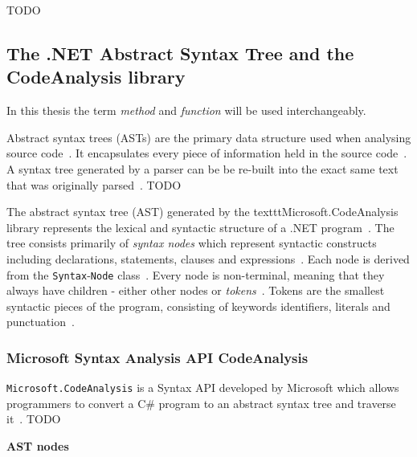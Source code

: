 \documentclass[a4paper,12pt]{article}
\begin{document}
TODO

\subsection{The .NET Abstract Syntax Tree and the CodeAnalysis library} \label{The .NET Abstract Syntax Tree and the CodeAnalysis library}

In this thesis the term \textit{method} and \textit{function} will be used interchangeably.

Abstract syntax trees (ASTs) are the primary data structure used when analysing source code~\cite{microsoft-work-with-syntax}. It encapsulates every piece of information held in the source code~\cite{microsoft-work-with-syntax}. A syntax tree generated by a parser can be be re-built into the exact same text that was originally parsed~\cite{microsoft-work-with-syntax}. TODO

The abstract syntax tree (AST) generated by the texttt{Microsoft.CodeAnalysis} library represents the lexical and syntactic structure of a .NET program~\cite{microsoft-work-with-syntax}. The tree consists primarily of \textit{syntax nodes} which represent syntactic constructs including declarations, statements, clauses and expressions~\cite{microsoft-work-with-syntax}. Each node is derived from the \texttt{Syntax}-\texttt{Node} class~\cite{microsoft-work-with-syntax}. Every node is non-terminal, meaning that they always have children - either other nodes or \textit{tokens}~\cite{microsoft-work-with-syntax}. Tokens are the smallest syntactic pieces of the program, consisting of keywords identifiers, literals and punctuation~\cite{microsoft-work-with-syntax}.


\subsubsection{Microsoft Syntax Analysis API CodeAnalysis} \label{ssub:Microsoft Syntax Analysis API}
\texttt{Microsoft.CodeAnalysis} is a Syntax API developed by Microsoft which allows programmers to convert a C\# program to an abstract syntax tree and traverse it~\cite{microsoft-syntax-API}. TODO

\textbf{AST nodes}
\end{document}
